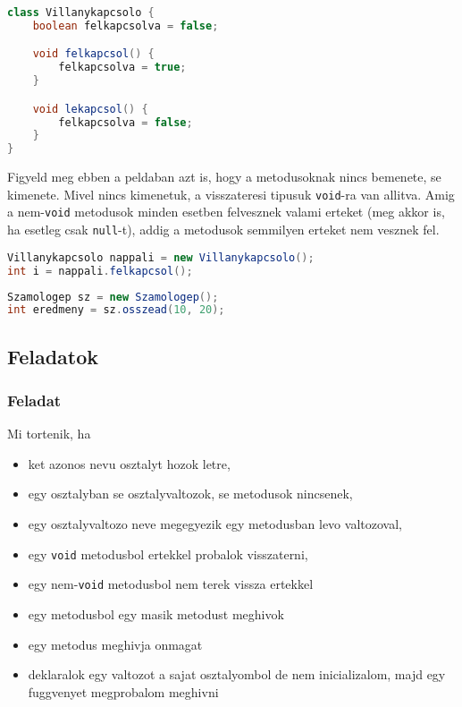 \documentclass{article}
\let\l\lstinline
\begin{document}
\begin{lstlisting}[language=Java, caption=Villanykapcsolo osztaly]
class Villanykapcsolo {
    boolean felkapcsolva = false;

    void felkapcsol() {
        felkapcsolva = true;
    }

    void lekapcsol() {
        felkapcsolva = false;
    }
}
\end{lstlisting}

Figyeld meg ebben a peldaban azt is, hogy a metodusoknak nincs bemenete, se kimenete. Mivel nincs
kimenetuk, a visszateresi tipusuk \l{void}-ra van allitva. Amig a nem-\l{void} metodusok minden
esetben felvesznek valami erteket (meg akkor is, ha esetleg csak \l{null}-t), addig a 
metodusok semmilyen erteket nem vesznek fel.

\begin{lstlisting}[language=Java, caption=Ez a kod hibat okoz]
Villanykapcsolo nappali = new Villanykapcsolo();
int i = nappali.felkapcsol();
\end{lstlisting}

\begin{lstlisting}[language=Java, caption=Ez a kod nem okoz hibat]
Szamologep sz = new Szamologep();
int eredmeny = sz.osszead(10, 20);
\end{lstlisting}

\newpage

\subsection{Feladatok}

\subsubsection{Feladat}

Mi tortenik, ha
\begin{itemize}
    \item ket azonos nevu osztalyt hozok letre,
    \item egy osztalyban se osztalyvaltozok, se metodusok nincsenek,
    \item egy osztalyvaltozo neve megegyezik egy metodusban levo valtozoval,
    \item egy \l{void} metodusbol ertekkel probalok visszaterni,
    \item egy nem-\l{void} metodusbol nem terek vissza ertekkel
    \item egy metodusbol egy masik metodust meghivok
    \item egy metodus meghivja onmagat
    \item deklaralok egy valtozot a sajat osztalyombol de nem inicializalom, majd egy fuggvenyet megprobalom meghivni
\end{itemize}
\end{document}
